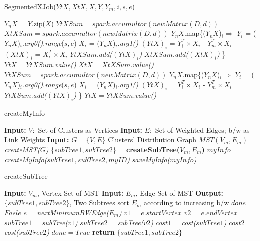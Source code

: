 \documentclass[10pt,conference,letterpaper]{IEEEtran}
\begin{document}
\begin{algorithm} [!htbp]
\label{segmented2}
  \caption{SegmentedXJob($YtX,XtX,X,Y,Y_m,i,s,e$)}
  \begin{algorithmic} [1]
	\State $Y_nX$ = $Y$.zip($X$)
	   
	 		\State $YtXSum = spark.accumultor(newMatrix(D,d))$
			\State $XtXSum = spark.accumultor(newMatrix(D,d))$
	 		\State $Y_nX$.map\{($Y_nX$)$_i \Rightarrow$
	 		\State \tab $Y_i$ = ($Y_nX$)$_i$.\textit{arg0()}.\textit{range}($s,e$)
			\State \tab $X_i$ = ($Y_nX$)$_i$.\textit{arg1()}
			\State \tab $(YtX)_i$ = $Y_i^T \times  X_i$ - $Y_m^T \times X_i$   
			\State \tab $(XtX)_i$ = $X_i^T \times  X_i$
			 \State \tab $YtXSum$.\textit{add($(YtX)_i$)}
			 \State \tab $XtXSum$.\textit{add($(XtX)_i$)}
			\State \}
		\State $YtX = YtXSum$.\textit{value()}
		\State $XtX = XtXSum$.\textit{value()}
	\Else
			\State $YtXSum = spark.accumultor(newMatrix(D,d))$
	 		\State $Y_nX$.map\{($Y_nX$)$_i \Rightarrow$
			\State \tab $Y_i$ = ($Y_nX$)$_i$.\textit{arg0()}.\textit{range}($s,e$)
			\State \tab $X_i$ = ($Y_nX$)$_i$.\textit{arg1()}
			\State \tab $(YtX)_i$ = $Y_i^T \times  X_i$ - $Y_m^T \times X_i$   
			 \State \tab $YtXSum$.\textit{add($(YtX)_i$)}
			\State \}
		\State $YtX = YtXSum$.\textit{value()}
	 \EndIf
  \end{algorithmic}
\end{algorithm}

\begin{algorithm}[!htbp]
	\caption{createMyInfo}
	\begin{algorithmic} [1]
	\State \textbf{Input: }$V: $ Set of Clusters as Vertices
	\State \textbf{Input: }$E: $ Set of Weighted Edges; b/w as Link Weights
	\State \textbf{Input: }$G=\{V,E\}$ Clusters' Distribution Graph
	\State $MST(V_m,E_m)$ = \textit{createMST($G$)}
	\State \{$subTree1, subTree2$\} = \textbf{createSubTree($V_m,E_m$)}
	\State $myInfo$ = \textit{createMyInfo($subTree1, subTree2, myID$)}
	\State \textit{saveMyInfo($myInfo$)}
	\end{algorithmic}
\end{algorithm}

\begin{algorithm} [!htbp]
\label{algo6}
	\caption{createSubTree}
	\begin{algorithmic}[1]
		\State \textbf{Input: }$V_m$, Vertex Set of MST
		\State \textbf{Input:}	$E_m$, Edge Set of MST
		\State \textbf{Output: }$\{subTree1, subTree2\}$, Two Subtrees
		\State sort $E_m$ according to increasing b/w
		\State $done$=$Fasle$
			\State $e$ = \textit{nextMinimumBWEdge($E_m$)}
			\State $v1$ = $e.startVertex$
			\State $v2$ = $e.endVertex$
			\State $subTree1$ = \textit{subTree($v1$)}
			\State $subTree2$ = \textit{subTree($v2$)}
			\State $cost1$ = \textit{cost($subTree1$)}
			\State $cost2$ = \textit{cost($subTree2$)}
				\State $done = True$
			\EndIf
		\EndWhile	
		\State \textbf{return} $\{subTree1, subTree2\}$
	\end{algorithmic}
\end{algorithm}
\end{document}
